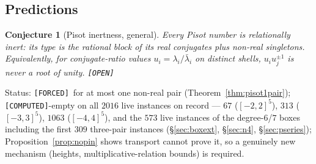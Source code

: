 \documentclass[11pt]{article}
\newcommand{\F}{\textnormal{\texttt{[FORCED]}}}
\newcommand{\C}{\textnormal{\texttt{[COMPUTED]}}}
\newcommand{\Op}{\textnormal{\texttt{[OPEN]}}}
\newtheorem{conjecture}[theorem]{Conjecture}
\theoremstyle{definition}
\begin{document}
\subsection{Predictions}
\begin{conjecture}[Pisot inertness, general]\label{conj:pisot}
Every Pisot number is relationally inert: its type is the rational block of its
real conjugates plus non-real singletons. Equivalently, for conjugate-ratio
values $u_i=\lambda_i/\bar\lambda_i$ on distinct shells, $u_iu_j^{\pm1}$ is
never a root of unity. \Op
\end{conjecture}

Status: \F\ for at most one non-real pair (Theorem~\ref{thm:pisot1pair});
\C-empty on all $2016$ live instances on record --- $67$ ($[-2,2]^5$),
$313$ ($[-3,3]^5$), $1063$ ($[-4,4]^5$), and the $573$ live instances of
the degree-$6$/$7$ boxes including the first $309$ three-pair instances
(\S\ref{sec:boxext}, \S\ref{sec:n4}, \S\ref{sec:pseries});
Proposition~\ref{prop:nopin} shows transport cannot prove it, so a genuinely
new mechanism (heights, multiplicative-relation bounds) is required.
\end{document}

